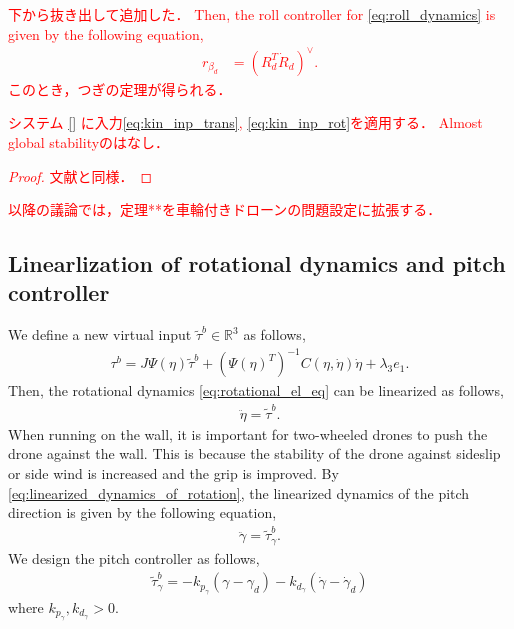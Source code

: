 \textcolor{red}{
    下から抜き出して追加した．
    Then, the roll controller for \eqref{eq:roll_dynamics} is given by the following equation,
    \begin{align}
    \label{eq:kin_inp_rot}
        r_{\beta_d} & = (R_d^T \dot{R}_d)^{\vee}.
    \end{align}
    このとき，つぎの定理が得られる．
\begin{theorem}{\cite{rodriguez-cortesNewGeometricTrajectory2022}}
    システム \eqref{} に入力\eqref{eq:kin_inp_trans}, \eqref{eq:kin_inp_rot}を適用する．
    Almost global stabilityのはなし．
\end{theorem}
\begin{proof}
    文献\cite{rodriguez-cortesNewGeometricTrajectory2022}と同様．
\end{proof}
以降の議論では，定理**を車輪付きドローンの問題設定に拡張する．
}


\subsection{Linearlization of rotational dynamics and pitch controller}
\label{subsec:linearizer_and_pitch_controller}
We define a new virtual input $ \tilde{\tau}^b \in \mathbb{R}^3 $ as follows,
\begin{align}
    \label{eq:vertual_input_of_tau}
    \tau^b = J \Psi(\eta) \tilde{\tau}^b + \left (\Psi(\eta)^T \right )^{-1} C(\eta, \dot{\eta}) \dot{\eta} + \lambda_3 e_1.
\end{align}
Then, the rotational dynamics \eqref{eq:rotational_el_eq} can be linearized as follows,
\begin{align}
    \label{eq:linearized_dynamics_of_rotation}
    \ddot{\eta} = \tilde{\tau}^b.
\end{align}
When running on the wall, it is important for two-wheeled drones to push the drone against the wall.
This is because the stability of the drone against sideslip or side wind is increased and the grip is improved.
By \eqref{eq:linearized_dynamics_of_rotation}, the linearized dynamics of the pitch direction is given by the following equation,
\begin{align}
    \label{eq:linearized_dynamics_of_pitch}
    \ddot{\gamma} = \tilde{\tau}_{\gamma}^b.
\end{align}
We design the pitch controller as follows,
\begin{align}
    \label{eq:controller_of_pitch}
    \tilde{\tau}_{\gamma}^b = - k_{p_{\gamma}} (\gamma - \gamma_d) - k_{d_{\gamma}} (\dot{\gamma} - \dot{\gamma}_d)
\end{align}
where $ k_{p_{\gamma}}, k_{d_{\gamma}} > 0 $.



